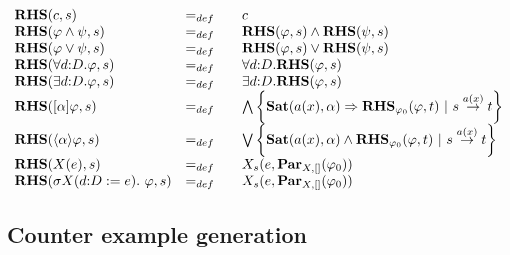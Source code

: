 \documentclass{article}
\begin{document}
$%
\begin{array}{lll}
{\mathbf{RHS}}(c,s) & =_{def} & c \\
{\mathbf{RHS}}(\varphi \wedge \psi ,s) & =_{def} & {\mathbf{%
RHS}}(\varphi ,s)\wedge {\mathbf{RHS}}(\psi ,s)
\\
{\mathbf{RHS}}(\varphi \vee \psi ,s) & =_{def} & {\mathbf{RHS}%
}(\varphi ,s)\vee {\mathbf{RHS}}(\psi ,s) \\
{\mathbf{RHS}}(\forall d{{:}D}.\varphi ,s) & =_{def} &
\forall d{{:}D}.{\mathbf{RHS}}(\varphi ,s) \\
{\mathbf{RHS}}(\exists d{{:}D}.\varphi ,s) & =_{def} &
\exists d{{:}D}.{\mathbf{RHS}}(\varphi ,s) \\
{\mathbf{RHS}}([\alpha ]\varphi ,s) & =_{def} & \bigwedge
\left\{ \mathbf{Sat}(a(x),\alpha )\Rightarrow {\mathbf{RHS}}_{\varphi
_{0}}(\varphi ,t)\ |\ s\overset{a(x)}{\rightarrow }t\right\}  \\
{\mathbf{RHS}}(\langle \alpha \rangle \varphi ,s) & =_{def} &
\bigvee \left\{ \mathbf{Sat}(a(x),\alpha )\wedge {\mathbf{RHS}}_{\varphi
_{0}}(\varphi ,t)\ |\ s\overset{a(x)}{\rightarrow }t\right\}  \\
{\mathbf{RHS}}(X(e),s) & =_{def} & X_{s}(e,\mathbf{Par}%
_{X,[]}(\varphi _{0})) \\
{\mathbf{RHS}}(\sigma X(d{:}D:=e).~\varphi ,s) & =_{def}~~~ &
X_{s}(e,\mathbf{Par}_{X,[]}(\varphi _{0}))%
\end{array}%
$\pagebreak

\subsection{Counter example generation}
\end{document}
